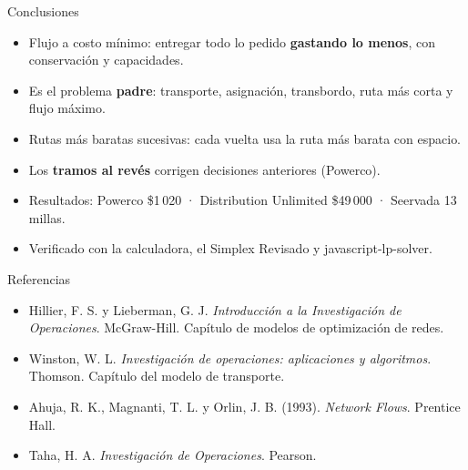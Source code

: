 \documentclass[aspectratio=169]{beamer}
\begin{document}
\begin{frame}{Conclusiones}
  \begin{itemize}\setlength{\itemsep}{0.7em}
    \item Flujo a costo mínimo: entregar todo lo pedido \textbf{gastando lo menos}, con conservación y capacidades.
    \item Es el problema \textbf{padre}: transporte, asignación, transbordo, ruta más corta y flujo máximo.
    \item Rutas más baratas sucesivas: cada vuelta usa la ruta más barata con espacio.
    \item Los \textbf{tramos al revés} corrigen decisiones anteriores (Powerco).
    \item Resultados: Powerco \$1\,020 · Distribution Unlimited \$49\,000 · Seervada 13 millas.
    \item Verificado con la calculadora, el Simplex Revisado y javascript-lp-solver.
  \end{itemize}
\end{frame}

\begin{frame}{Referencias}
  \small
  \begin{itemize}\setlength{\itemsep}{0.6em}
    \item Hillier, F. S. y Lieberman, G. J. \textit{Introducción a la Investigación de Operaciones}. McGraw-Hill.
          Capítulo de modelos de optimización de redes.
    \item Winston, W. L. \textit{Investigación de operaciones: aplicaciones y algoritmos}. Thomson.
          Capítulo del modelo de transporte.
    \item Ahuja, R. K., Magnanti, T. L. y Orlin, J. B. (1993). \textit{Network Flows}. Prentice Hall.
    \item Taha, H. A. \textit{Investigación de Operaciones}. Pearson.
  \end{itemize}
\end{frame}
\end{document}

